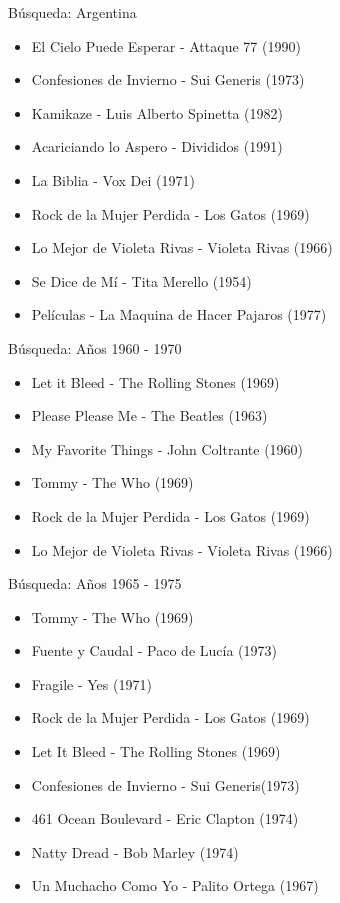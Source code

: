 \begin{mybox}{Búsqueda: Argentina}
\begin{itemize}
	\item {\scriptsize El Cielo Puede Esperar - Attaque 77 (1990)}
	\item {\scriptsize Confesiones de Invierno - Sui Generis (1973)}
	\item {\scriptsize Kamikaze - Luis Alberto Spinetta (1982)}
	\item {\scriptsize Acariciando lo Aspero - Divididos (1991)}
	\item {\scriptsize La Biblia - Vox Dei (1971)}
	\item {\scriptsize Rock de la Mujer Perdida - Los Gatos (1969)}
	\item {\scriptsize Lo Mejor de Violeta Rivas - Violeta Rivas (1966)}
	\item {\scriptsize Se Dice de Mí - Tita Merello (1954)}
	\item {\scriptsize Películas - La Maquina de Hacer Pajaros (1977)}
\end{itemize}
\end{mybox}

\begin{mybox}{Búsqueda: Años 1960 - 1970}
\begin{itemize}
	\item {\scriptsize Let it Bleed - The Rolling Stones (1969)}
	\item {\scriptsize Please Please Me - The Beatles (1963)}
	\item {\scriptsize My Favorite Things - John Coltrante (1960)}
	\item {\scriptsize Tommy - The Who (1969)}
	\item {\scriptsize Rock de la Mujer Perdida - Los Gatos (1969)}
	\item {\scriptsize Lo Mejor de Violeta Rivas - Violeta Rivas (1966)}
\end{itemize}
\end{mybox}

\begin{mybox}{Búsqueda: Años 1965 - 1975}
\begin{itemize}
	\item {\scriptsize Tommy - The Who (1969)}
	\item {\scriptsize Fuente y Caudal - Paco de Lucía (1973)}
	\item {\scriptsize Fragile - Yes (1971)}
	\item {\scriptsize Rock de la Mujer Perdida - Los Gatos (1969)}
	\item {\scriptsize Let It Bleed - The Rolling Stones (1969)}
	\item {\scriptsize Confesiones de Invierno - Sui Generis(1973)}
	\item {\scriptsize 461 Ocean Boulevard - Eric Clapton (1974)}
	\item {\scriptsize Natty Dread - Bob Marley (1974)}
	\item {\scriptsize Un Muchacho Como Yo - Palito Ortega (1967)}
\end{itemize}
\end{mybox}

